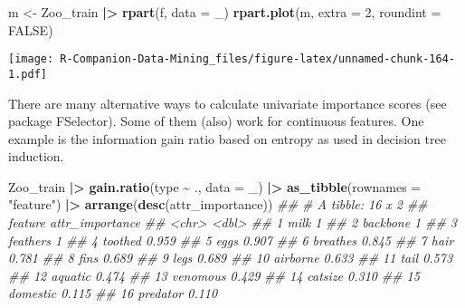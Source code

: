 \documentclass[
  notitlepage]{book}
\newenvironment{Shaded}{\begin{snugshade}}{\end{snugshade}}
\newcommand{\CommentTok}[1]{\textcolor[rgb]{0.56,0.35,0.01}{\textit{#1}}}
\newcommand{\DataTypeTok}[1]{\textcolor[rgb]{0.13,0.29,0.53}{#1}}
\newcommand{\DecValTok}[1]{\textcolor[rgb]{0.00,0.00,0.81}{#1}}
\newcommand{\ErrorTok}[1]{\textcolor[rgb]{0.64,0.00,0.00}{\textbf{#1}}}
\newcommand{\KeywordTok}[1]{\textcolor[rgb]{0.13,0.29,0.53}{\textbf{#1}}}
\newcommand{\NormalTok}[1]{#1}
\newcommand{\OperatorTok}[1]{\textcolor[rgb]{0.81,0.36,0.00}{\textbf{#1}}}
\newcommand{\OtherTok}[1]{\textcolor[rgb]{0.56,0.35,0.01}{#1}}
\newcommand{\StringTok}[1]{\textcolor[rgb]{0.31,0.60,0.02}{#1}}
\begin{document}
\begin{Shaded}
\begin{Highlighting}[]
\NormalTok{m \textless{}{-}}\StringTok{ }\NormalTok{Zoo\_train }\OperatorTok{|}\ErrorTok{\textgreater{}}\StringTok{ }\KeywordTok{rpart}\NormalTok{(f, }\DataTypeTok{data =}\NormalTok{ \_)}
\KeywordTok{rpart.plot}\NormalTok{(m, }\DataTypeTok{extra =} \DecValTok{2}\NormalTok{, }\DataTypeTok{roundint =} \OtherTok{FALSE}\NormalTok{)}
\end{Highlighting}
\end{Shaded}

\texttt{[image: R-Companion-Data-Mining\_files/figure-latex/unnamed-chunk-164-1.pdf]}

There are many alternative ways to calculate univariate importance
scores (see package FSelector). Some of them (also) work for continuous
features. One example is the information gain ratio based on entropy as
used in decision tree induction.

\begin{Shaded}
\begin{Highlighting}[]
\NormalTok{Zoo\_train }\OperatorTok{|}\ErrorTok{\textgreater{}}\StringTok{ }
\StringTok{  }\KeywordTok{gain.ratio}\NormalTok{(type }\OperatorTok{\textasciitilde{}}\StringTok{ }\NormalTok{., }\DataTypeTok{data =}\NormalTok{ \_) }\OperatorTok{|}\ErrorTok{\textgreater{}}
\StringTok{  }\KeywordTok{as\_tibble}\NormalTok{(}\DataTypeTok{rownames =} \StringTok{"feature"}\NormalTok{) }\OperatorTok{|}\ErrorTok{\textgreater{}}
\StringTok{  }\KeywordTok{arrange}\NormalTok{(}\KeywordTok{desc}\NormalTok{(attr\_importance))}
\CommentTok{\#\# \# A tibble: 16 x 2}
\CommentTok{\#\#    feature  attr\_importance}
\CommentTok{\#\#    \textless{}chr\textgreater{}              \textless{}dbl\textgreater{}}
\CommentTok{\#\#  1 milk               1    }
\CommentTok{\#\#  2 backbone           1    }
\CommentTok{\#\#  3 feathers           1    }
\CommentTok{\#\#  4 toothed            0.959}
\CommentTok{\#\#  5 eggs               0.907}
\CommentTok{\#\#  6 breathes           0.845}
\CommentTok{\#\#  7 hair               0.781}
\CommentTok{\#\#  8 fins               0.689}
\CommentTok{\#\#  9 legs               0.689}
\CommentTok{\#\# 10 airborne           0.633}
\CommentTok{\#\# 11 tail               0.573}
\CommentTok{\#\# 12 aquatic            0.474}
\CommentTok{\#\# 13 venomous           0.429}
\CommentTok{\#\# 14 catsize            0.310}
\CommentTok{\#\# 15 domestic           0.115}
\CommentTok{\#\# 16 predator           0.110}
\end{Highlighting}
\end{Shaded}
\end{document}

